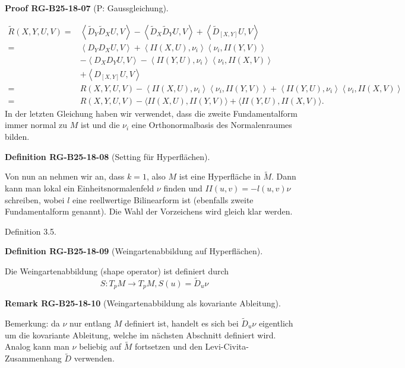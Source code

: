 \documentclass[10pt, letterpaper]{article}
\newcommand{\CustomHeading}[3]{%
  \par\medskip\noindent%
  \textbf{#1 #2} \textnormal{(#3)}.\enskip%
}
\newenvironment{DEF}[2]{\begin{unitbox}\CustomHeading{Definition}{#1}{#2}}{\end{unitbox}}
\newenvironment{REM}[2]{\begin{unitbox}\CustomHeading{Remark}{#1}{#2}}{\end{unitbox}}
\newenvironment{PROOF}[2]{\begin{unitbox}\CustomHeading{Proof}{#1}{#2}}{\end{unitbox}}
\begin{document}
\begin{PROOF}{RG-B25-18-07}{P: Gaussgleichung}
$$
\begin{aligned} \tilde{R}(X, Y, U, V)= & \left\langle\tilde{D}_Y \tilde{D}_X U, V\right\rangle-\left\langle\tilde{D}_X \tilde{D}_Y U, V\right\rangle+\left\langle\tilde{D}_{[X, Y]} U, V\right\rangle \\ = & \left\langle D_Y D_X U, V\right\rangle+\left\langle I I(X, U), \nu_i\right\rangle\left\langle\nu_i, I I(Y, V)\right\rangle \\ & -\left\langle D_X D_Y U, V\right\rangle-\left\langle I I(Y, U), \nu_i\right\rangle\left\langle\nu_i, I I(X, V)\right\rangle \\ & +\left\langle D_{[X, Y]} U, V\right\rangle \\ = & R(X, Y, U, V)-\left\langle I I(X, U), \nu_i\right\rangle\left\langle\nu_i, I I(Y, V)\right\rangle+\left\langle I I(Y, U), \nu_i\right\rangle\left\langle\nu_i, I I(X, V)\right\rangle \\ = & R(X, Y, U, V)-\langle I I(X, U), I I(Y, V)\rangle+\langle I I(Y, U), I I(X, V)\rangle .\end{aligned}
$$
In der letzten Gleichung haben wir verwendet, dass die zweite Fundamentalform immer normal zu $M$ ist und die $\nu_{i}$ eine Orthonormalbasis des Normalenraumes bilden.
\end{PROOF}




\begin{DEF}{RG-B25-18-08}{Setting für Hyperflächen}
Von nun an nehmen wir an, dass $k=1$, also $M$ ist eine Hyperfläche in $\tilde{M}$. Dann kann man lokal ein Einheitsnormalenfeld $\nu$ finden und $I I(u, v)=-l(u, v) \nu$ schreiben, wobei $l$ eine reellwertige Bilinearform ist (ebenfalls zweite Fundamentalform genannt). Die Wahl der Vorzeichens wird gleich klar werden.
\end{DEF}

Definition 3.5. 


\begin{DEF}{RG-B25-18-09}{Weingartenabbildung auf Hyperflächen}
Die Weingartenabbildung (shape operator) ist definiert durch
$$
S: T_{p} M \rightarrow T_{p} M, S(u)=\tilde{D}_{u} \nu
$$
\end{DEF}

\begin{REM}{RG-B25-18-10}{Weingartenabbildung als kovariante Ableitung}
Bemerkung: da $\nu$ nur entlang $M$ definiert ist, handelt es sich bei $\tilde{D}_{u} \nu$ eigentlich um die kovariante Ableitung, welche im nächsten Abschnitt definiert wird. Analog kann man $\nu$ beliebig auf $\tilde{M}$ fortsetzen und den Levi-Civita-Zusammenhang $\tilde{D}$ verwenden.
\end{REM}
\end{document}
